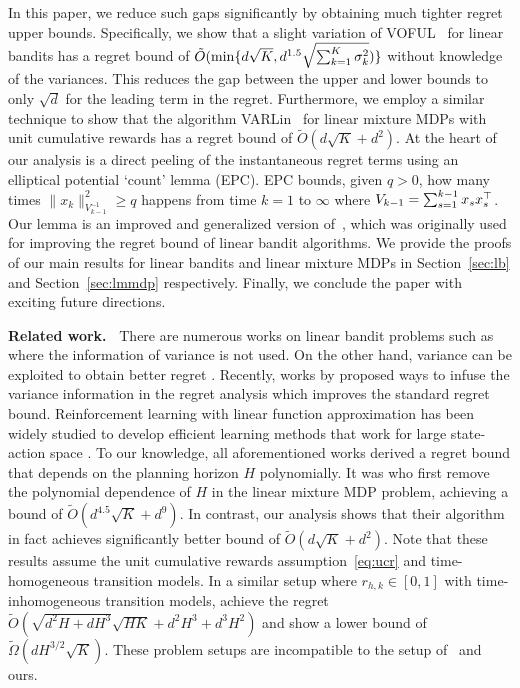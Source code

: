 \documentclass{article}
\begin{document}
In this paper, we reduce such gaps significantly by obtaining much tighter regret upper bounds.
Specifically, we show that a slight variation of VOFUL~\cite{zhang21variance} for linear bandits has a regret bound of $\tilde O(\min\{d\sqrt{K}, d^{1.5}\sqrt{\sum_{k=1}^K \sigma_k^2})\}$ without knowledge of the variances.
This reduces the gap between the upper and lower bounds to only $\sqrt{d}$ for the leading term in the regret.
Furthermore, we employ a similar technique to show that the algorithm VARLin~\cite{zhang21variance} for linear mixture MDPs with unit cumulative rewards has a regret bound of $\tilde O(d\sqrt{K} + d^2)$.
At the heart of our analysis is a direct peeling of the instantaneous regret terms using an elliptical potential `count' lemma (EPC).
EPC bounds, given $q>0$, how many times $\|x_k\|_{V_{k-1}^{-1}}^2 \geq q$ happens from time $k=1$ to $\infty$ where $V_{k-1} = \sum_{s=1}^{k-1} x_s x_s^{\top}$.
Our lemma is an improved and generalized version of~\cite[Exercise 19.3]{lattimore20bandit}, which was originally used for improving the regret bound of linear bandit algorithms.
We provide the proofs of our main results for linear bandits and linear mixture MDPs in Section~\ref{sec:lb} and Section~\ref{sec:lmmdp} respectively.
Finally, we conclude the paper with exciting future directions.

\textbf{Related work.~}
%
There are numerous works on linear bandit problems such as \cite{dani08stochastic, auer03nonstochastic,ay11improved,li19nearly} where the information of variance is not used. On the other hand, variance can be exploited to obtain better regret \cite{audibert2006use}. Recently, works by \cite{zhang21variance, zhou2021nearly} proposed ways to infuse the variance information in the regret analysis which improves the standard regret bound. 
%
Reinforcement learning with linear function approximation has been widely studied to develop efficient learning methods that work for large state-action space \cite{yang2019sample,wen2013efficient,jiang2017contextual,du2019provably,jin2020provably,wang2020reward,wang2020provably,wang20optimism,zanette2020learning,misra2020kinematic,krishnamurthy2016pac,dann2018oracle,sun2019model,feng2020provably,du2020agnostic,yang2020reinforcement}. 
To our knowledge, all aforementioned works derived a regret bound that depends on the planning horizon $H$ polynomially. 
It was \citet{zhang21variance} who first remove the polynomial dependence of $H$ in the linear mixture MDP problem, achieving a bound of $\tilde O(d^{4.5}\sqrt{K}+d^9)$.
In contrast, our analysis shows that their algorithm in fact achieves significantly better bound of $\tilde O(d\sqrt{K} + d^2)$.
Note that these results assume the unit cumulative rewards assumption~\eqref{eq:ucr} and time-homogeneous transition models.
In a similar setup where $r_{h,k} \in [0,1]$ with time-inhomogeneous transition models, \citet{zhou2021nearly} achieve the regret $\tilde O(\sqrt{d^2H+dH^3}\sqrt{HK}+d^2H^3+d^3H^2)$ and show a lower bound of $\tilde \Omega(dH^{3/2}\sqrt{K})$.
These problem setups are incompatible to the setup of~\cite{zhang21variance} and ours.
\end{document}
